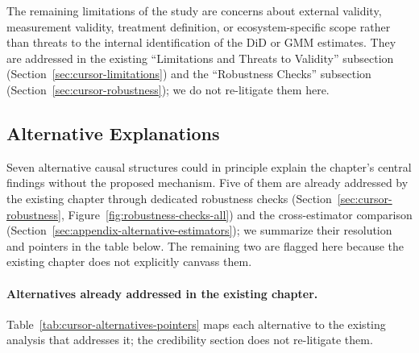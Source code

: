 The remaining limitations of the study are concerns about external validity, measurement validity, treatment definition, or ecosystem-specific scope rather than threats to the internal identification of the DiD or GMM estimates.
They are addressed in the existing ``Limitations and Threats to Validity'' subsection (Section~\ref{sec:cursor-limitations}) and the ``Robustness Checks'' subsection (Section~\ref{sec:cursor-robustness}); we do not re-litigate them here.

\subsection{Alternative Explanations}
\label{sec:cursor-credibility-alternatives}

Seven alternative causal structures could in principle explain the chapter's central findings without the proposed mechanism.
Five of them are already addressed by the existing chapter through dedicated robustness checks (Section~\ref{sec:cursor-robustness}, Figure~\ref{fig:robustness-checks-all}) and the cross-estimator comparison (Section~\ref{sec:appendix-alternative-estimators}); we summarize their resolution and pointers in the table below.
The remaining two are flagged here because the existing chapter does not explicitly canvass them.

\paragraph{Alternatives already addressed in the existing chapter.}
Table~\ref{tab:cursor-alternatives-pointers} maps each alternative to the existing analysis that addresses it; the credibility section does not re-litigate them.

